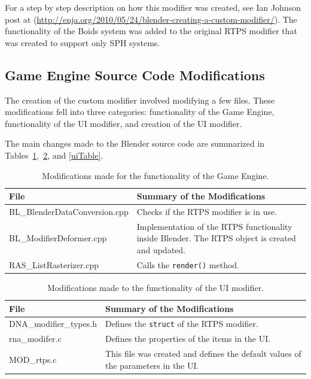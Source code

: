 For a step by step description on how this modifier was created, see Ian Johnson post at (\url{http://enja.org/2010/05/24/blender-creating-a-custom-modifier/}).  The functionality of the Boids system was added to the original RTPS modifier that was created to support only SPH systems. 

\subsection{Game Engine Source Code Modifications}
The creation of the custom modifier involved modifying a few files. These modifications fell into three categories: functionality of the Game Engine, functionality of the UI modifier, and  creation of the UI modifier.

The main changes made to the Blender source code are summarized in Tables~\ref{geTable},~\ref{funcTable}, and \ref{uiTable}.


\begin{table}[htdp]
\caption{Modifications made for the functionality of the Game Engine.}
\begin{center}
\begin{tabular}{|p{6cm}|p{6cm}|}
\hline 
\textbf{File} & \textbf{Summary of the Modifications} \\\hline 
BL\_BlenderDataConversion.cpp & Checks if the RTPS modifier is in use. \\\hline 
BL\_ModifierDeformer.cpp & Implementation of the RTPS functionality inside Blender. The RTPS object is created and updated. \\\hline 
RAS\_ListRasterizer.cpp & Calls the \texttt{render()} method. \\
\hline 
\end{tabular} 
\end{center}
\label{geTable}
\end{table}

\begin{table}[htdp]
\caption{Modifications made to the functionality of the UI modifier.}
\begin{center}
\begin{tabular}{|p{6cm}|p{6cm}|}
\hline 
\textbf{File} & \textbf{Summary of the Modifications} \\\hline 
DNA\_modifier\_types.h & Defines the \texttt{struct} of the RTPS modifier. \\\hline 
rna\_modifer.c & Defines the properties of the items in the UI. \\\hline 
MOD\_rtps.c & This file was created and defines the default values of the parameters in the UI. \\
\hline 
\end{tabular}
\end{center}
\label{funcTable}
\end{table}


